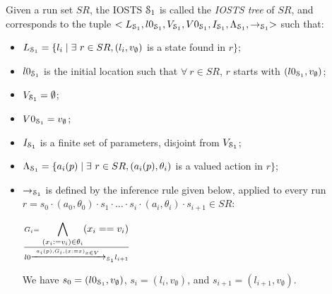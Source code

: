 \begin{definition}
    Given a run set $SR$, the IOSTS $\EuScript{S}_1$ is called
    the \emph{IOSTS tree} of $SR$, and corresponds to the tuple
    $<L_{\EuScript{S}_1}, l0_{\EuScript{S}_1},V_{\EuScript{S}_1},
    V0_{\EuScript{S}_1}, I_{\EuScript{S}_1},
    \Lambda_{\EuScript{S}_1},\rightarrow_{\EuScript{S}_1}>$ such
    that:

    \begin{itemize}

    \item $L_{\EuScript{S}_1}= \{l_i \mid \exists ~r \in SR,
        (l_i,v_\emptyset)$ is a state found in $r\}$;

    \item $l0_{\EuScript{S}_1}$ is the initial location such that
        $\forall ~r \in SR$, $r$ starts with
        $(l0_{\EuScript{S}_1},v_\emptyset)$;

    \item $V_{\EuScript{S}_1}=\emptyset$;

    \item $V0_{\EuScript{S}_1}=v_\emptyset$;

    \item $I_{\EuScript{S}_1}$ is a finite set of parameters,
        disjoint from $V_{\EuScript{S}_1}$;

    \item $\Lambda_{\EuScript{S}_1}= \{a_i(p) \mid \exists ~r \in SR,
        (a_i(p),\theta_i)$ is a valued action in $r\}$;

    \item $\rightarrow_{\EuScript{S}_1}$ is defined by the
        inference rule given below, applied to every run
        $r = s_0 \cdot (a_0,\theta_0) \cdot s_1 \cdot \dots \cdot
        s_i \cdot (a_i,\theta_i) \cdot s_{i+1} \in SR$:

        \begin{center}
            {\Large
            $\frac{G_i=\displaystyle \bigwedge_{(x_i:=v_i) \in
            \theta_i} (x_i==v_i)}
            {l0 \xrightarrow{a_i(p),G_i,(x:=x)_{x\in
            V}}_{\EuScript{S}_1} l_{i+1}}$
        }
        \end{center}

        We have $s_0 = (l0_{\EuScript{S}_1}, v_{\emptyset})$, $s_i = (l_i,
        v_{\emptyset})$, and $s_{i+1} = (l_{i+1}, v_{\emptyset})$.
    \end{itemize}

    \label{IOSTS_tree}
\end{definition}

